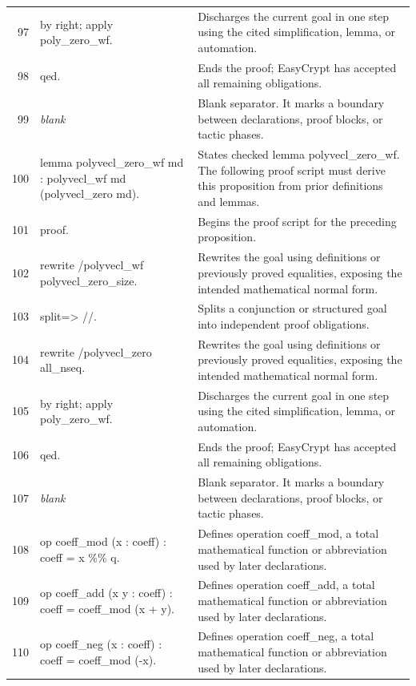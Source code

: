 \documentclass[10pt]{article}
\begin{document}
\begin{longtable}{r L{0.53\textwidth} L{0.37\textwidth}}
97 & {\ttfamily\scriptsize by right; apply poly\_zero\_wf.} & Discharges the current goal in one step using the cited simplification, lemma, or automation. \\
98 & {\ttfamily\scriptsize qed.} & Ends the proof; EasyCrypt has accepted all remaining obligations. \\
99 & {\ttfamily\scriptsize \emph{blank}} & Blank separator.  It marks a boundary between declarations, proof blocks, or tactic phases. \\
100 & {\ttfamily\scriptsize lemma polyvecl\_zero\_wf md : polyvecl\_wf md (polyvecl\_zero md).} & States checked lemma polyvecl\_zero\_wf.  The following proof script must derive this proposition from prior definitions and lemmas. \\
101 & {\ttfamily\scriptsize proof.} & Begins the proof script for the preceding proposition. \\
102 & {\ttfamily\scriptsize rewrite /polyvecl\_wf polyvecl\_zero\_size.} & Rewrites the goal using definitions or previously proved equalities, exposing the intended mathematical normal form. \\
103 & {\ttfamily\scriptsize split=> //.} & Splits a conjunction or structured goal into independent proof obligations. \\
104 & {\ttfamily\scriptsize rewrite /polyvecl\_zero all\_nseq.} & Rewrites the goal using definitions or previously proved equalities, exposing the intended mathematical normal form. \\
105 & {\ttfamily\scriptsize by right; apply poly\_zero\_wf.} & Discharges the current goal in one step using the cited simplification, lemma, or automation. \\
106 & {\ttfamily\scriptsize qed.} & Ends the proof; EasyCrypt has accepted all remaining obligations. \\
107 & {\ttfamily\scriptsize \emph{blank}} & Blank separator.  It marks a boundary between declarations, proof blocks, or tactic phases. \\
108 & {\ttfamily\scriptsize op coeff\_mod (x : coeff) : coeff = x \%\% q.} & Defines operation coeff\_mod, a total mathematical function or abbreviation used by later declarations. \\
109 & {\ttfamily\scriptsize op coeff\_add (x y : coeff) : coeff = coeff\_mod (x + y).} & Defines operation coeff\_add, a total mathematical function or abbreviation used by later declarations. \\
110 & {\ttfamily\scriptsize op coeff\_neg (x : coeff) : coeff = coeff\_mod (-x).} & Defines operation coeff\_neg, a total mathematical function or abbreviation used by later declarations. \\

\end{longtable}
\end{document}
